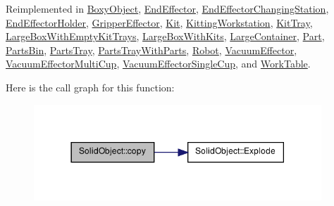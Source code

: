 Reimplemented in \hyperlink{class_boxy_object_a3ad370f98134160310755471107c1ca0}{BoxyObject}, \hyperlink{class_end_effector_a60c32047ac0826ef80a10b8477132d7c}{EndEffector}, \hyperlink{class_end_effector_changing_station_aef4439a4f2d445529c5533af38f2dc72}{EndEffectorChangingStation}, \hyperlink{class_end_effector_holder_ac71fd774314e2b9fae1eaec2766f76c3}{EndEffectorHolder}, \hyperlink{class_gripper_effector_a446ce56a6195c2b0dcccc6a6fcdd1961}{GripperEffector}, \hyperlink{class_kit_a89458dd359627ea4089bb69d36db3a9c}{Kit}, \hyperlink{class_kitting_workstation_a4d435a3c5af3a1447d18b46ed3fdba76}{KittingWorkstation}, \hyperlink{class_kit_tray_af1043bb5db0b1117de27c6ec4b3a113b}{KitTray}, \hyperlink{class_large_box_with_empty_kit_trays_ac8a7395a8b46633d46fde2f19cbbad67}{LargeBoxWithEmptyKitTrays}, \hyperlink{class_large_box_with_kits_af276265580b61b3faa5c51be9deb8829}{LargeBoxWithKits}, \hyperlink{class_large_container_a49edb1d47b46abdef3ffd11704d64fd3}{LargeContainer}, \hyperlink{class_part_a7289c3b66fff324e5abc8521b2d2a952}{Part}, \hyperlink{class_parts_bin_afb7e5abe1f22afeb3d23640d2a968c44}{PartsBin}, \hyperlink{class_parts_tray_a04a7bd17fc8b13de088bd359f3e3dbd8}{PartsTray}, \hyperlink{class_parts_tray_with_parts_ac79b4dc47be8add4b40639cff36823ff}{PartsTrayWithParts}, \hyperlink{class_robot_a18293b5f0d4b14e8bfc361e9b45183cf}{Robot}, \hyperlink{class_vacuum_effector_ac180edaaca8f4bd76cb28f21f0846e3b}{VacuumEffector}, \hyperlink{class_vacuum_effector_multi_cup_a4fc22178c8e73ce173566e34a451843c}{VacuumEffectorMultiCup}, \hyperlink{class_vacuum_effector_single_cup_a3a4386ea65ec07e7279301c6a26579a3}{VacuumEffectorSingleCup}, and \hyperlink{class_work_table_a1096cf39ac0cfb98f27b8157f2eeacb7}{WorkTable}.



Here is the call graph for this function:\nopagebreak
\begin{figure}[H]
\begin{center}
\leavevmode
\includegraphics[width=306pt]{class_solid_object_ac3c576278aad2366890e96889d7e24cf_cgraph}
\end{center}
\end{figure}





